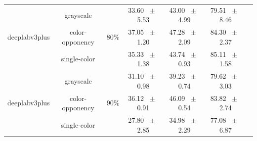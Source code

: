 \begin{table}[h]
\begin{tabular}{@{}lccc ccc@{}}
    \midrule
    \multirow{3}{*}{deeplabv3plus} & grayscale & \multirow{3}{*}{80\%} & 33.60 ~$\pm$~ 5.53 & 43.00 ~$\pm$~ 4.99 & 79.51 ~$\pm$~ 8.46 \\
    & color-opponency & & 37.05 ~$\pm$~ 1.20 & 47.28 ~$\pm$~ 2.09 & 84.30 ~$\pm$~ 2.37 \\
    & single-color & & 35.33 ~$\pm$~ 1.38 & 43.74 ~$\pm$~ 0.93 & 85.11 ~$\pm$~ 1.58 \\
    \midrule
    \multirow{3}{*}{deeplabv3plus} & grayscale & \multirow{3}{*}{90\%} & 31.10 ~$\pm$~ 0.98 & 39.23 ~$\pm$~ 0.74 & 79.62 ~$\pm$~ 3.03 \\
    & color-opponency & & 36.12 ~$\pm$~ 0.91 & 46.09 ~$\pm$~ 0.54 & 83.82 ~$\pm$~ 2.74 \\
    & single-color & & 27.80 ~$\pm$~ 2.85 & 34.98 ~$\pm$~ 2.29 & 77.08 ~$\pm$~ 6.87 \\
    \midrule
    \bottomrule
  \end{tabular}
  \label{tab:sparse_deeplabv3plus_acdc_rain}
\end{table}